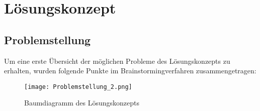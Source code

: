 \section{Lösungskonzept} \label{sec:loesungskonzept}
\subsection{Problemstellung} \label{subsec:problemstellung}
Um eine erste Übersicht der möglichen Probleme des Lösungskonzepts zu erhalten, wurden folgende Punkte im Brainstormingverfahren zusammengetragen:
\begin{figure}[H]
	\centering
	\texttt{[image: Problemstellung\_2.png]}
	\caption{Baumdiagramm des Lösungskonzepts}
	\label{fig:Figure}
\end{figure}
\newpage















